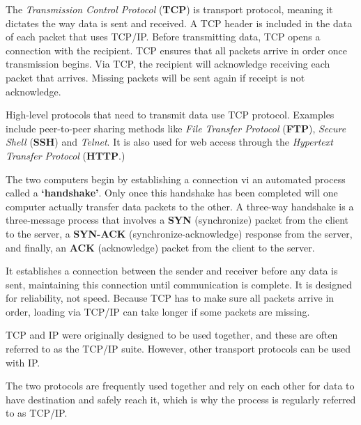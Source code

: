 The \emph{Transmission Control Protocol} (\textbf{TCP}) is transport protocol, meaning it dictates the way data is sent and received. A TCP header is included in the data of each packet that uses TCP/IP. Before transmitting data, TCP opens a connection with the recipient. TCP ensures that all packets arrive in order once transmission begins. Via TCP, the recipient will acknowledge receiving each packet that arrives. Missing packets will be sent again if receipt is not acknowledge.

High-level protocols that need to transmit data use TCP protocol. Examples include peer-to-peer sharing methods like \textit{File Transfer Protocol} (\textbf{FTP}), \textit{Secure Shell} (\textbf{SSH}) and \textit{Telnet}. It is also used for web access through the \textit{Hypertext Transfer Protocol} (\textbf{HTTP}.)

The two computers begin by establishing a connection vi an automated process called a \textbf{`handshake'}. Only once this handshake has been completed will one computer actually transfer data packets to the other. A three-way handshake is a three-message process that involves a \textbf{SYN} (synchronize) packet from the client to the server, a \textbf{SYN-ACK} (synchronize-acknowledge) response from the server, and finally, an \textbf{ACK} (acknowledge) packet from the client to the server.

It establishes a connection between the sender and receiver before any data is sent, maintaining this connection until communication is complete. It is designed for reliability, not speed. Because TCP has to make sure all packets arrive in order, loading via TCP/IP can take longer if some packets are missing.

TCP and IP were originally designed to be used together, and these are often referred to as the TCP/IP suite. However, other transport protocols can be used with IP.

The two protocols are frequently used together and rely on each other for data to have destination and safely reach it, which is why the process is regularly referred to as TCP/IP.
